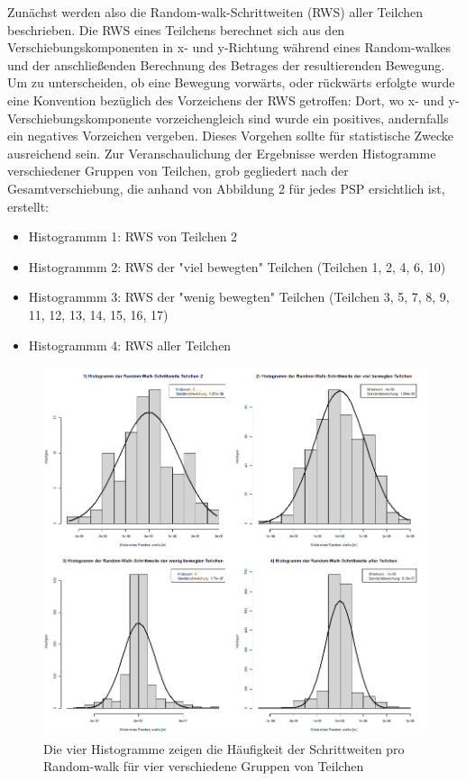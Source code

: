 \documentclass[
  9pt,
]{article}
\begin{document}
Zunächst werden also die Random-walk-Schrittweiten (RWS) aller Teilchen
beschrieben. Die RWS eines Teilchens berechnet sich aus den
Verschiebungskomponenten in x- und y-Richtung während eines
Random-walkes und der anschließenden Berechnung des Betrages der
resultierenden Bewegung. Um zu unterscheiden, ob eine Bewegung vorwärts,
oder rückwärts erfolgte wurde eine Konvention bezüglich des Vorzeichens
der RWS getroffen: Dort, wo x- und y-Verschiebungskomponente
vorzeichengleich sind wurde ein positives, andernfalls ein negatives
Vorzeichen vergeben. Dieses Vorgehen sollte für statistische Zwecke
ausreichend sein. Zur Veranschaulichung der Ergebnisse werden
Histogramme verschiedener Gruppen von Teilchen, grob gegliedert nach der
Gesamtverschiebung, die anhand von Abbildung 2 für jedes PSP ersichtlich
ist, erstellt:

\begin{itemize}
\item Histogrammm 1: RWS von Teilchen 2
\item Histogrammm 2: RWS der "viel bewegten" Teilchen (Teilchen 1, 2, 4, 6, 10)
\item Histogrammm 3: RWS der "wenig bewegten" Teilchen (Teilchen 3, 5, 7, 8, 9, 11, 12, 13, 14, 15, 16, 17)
\item Histogrammm 4: RWS aller Teilchen
\end{itemize}

\begin{figure}
\centering
\includegraphics[width=\textwidth,height=0.31\textheight]{code/Plots/Hist.png}
\caption{Die vier Histogramme zeigen die Häufigkeit der Schrittweiten
pro Random-walk für vier verschiedene Gruppen von Teilchen}
\end{figure}
\end{document}

